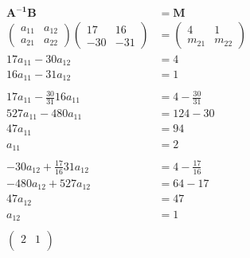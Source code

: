 \documentclass{article}
\begin{document}
\setcounter{subsubsection}{10}
\subsubsection{}

\begin{align*}
  \mathbf{A^{-1} B}                    & = \mathbf{M}                    \\
  \begin{pmatrix}
    a_{11} & a_{12} \\
    a_{21} & a_{22}
  \end{pmatrix} \begin{pmatrix}
                  17  & 16  \\
                  -30 & -31
                \end{pmatrix}        & = \begin{pmatrix}
                                           4      & 1      \\
                                           m_{21} & m_{22}
                                         \end{pmatrix}                 \\
  17 a_{11} - 30 a_{12}                & = 4                             \\
  16 a_{11} - 31 a_{12}                & = 1                             \\ \\
  17 a_{11} - \frac{30}{31} 16 a_{11}  & = 4 - \frac{30}{31}             \\
  527 a_{11} - 480 a_{11}              & = 124 - 30                      \\
  47 a_{11}                            & = 94                            \\
  a_{11}                               & = 2                             \\ \\
  -30 a_{12} + \frac{17}{16} 31 a_{12} & = 4 - \frac{17}{16}             \\
  -480 a_{12} + 527 a_{12}             & = 64 - 17                       \\
  47 a_{12}                            & = 47                            \\
  a_{12}                               & = 1                             \\ \\
  \begin{pmatrix}
    2      & 1      \\

\end{pmatrix}
\end{align*}
\end{document}
